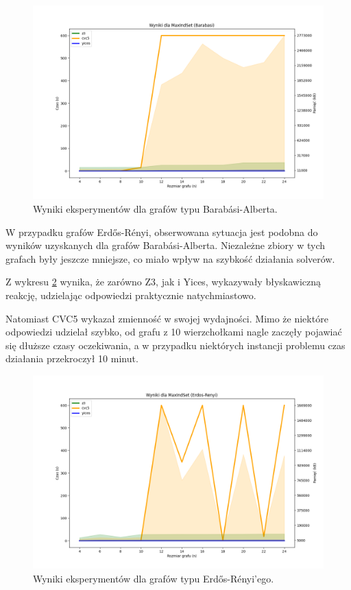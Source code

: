 \begin{figure}[htbp]
	\centering
	\begin{minipage}{\textwidth}
		\includegraphics[width=\textwidth]{./figures/4-barabasi-plot.png}
		\caption{Wyniki eksperymentów dla grafów typu Barabási-Alberta.}
		\label{fig:4-barabasi-plot}
	\end{minipage}
\end{figure}

W przypadku grafów Erdős-Rényi, obserwowana sytuacja jest podobna do wyników uzyskanych dla grafów Barabási-Alberta. Niezależne zbiory w tych grafach były jeszcze mniejsze, co miało wpływ na szybkość działania solverów.

Z wykresu \ref{fig:4-erdos-renyi-plot} wynika, że zarówno Z3, jak i Yices, wykazywały błyskawiczną reakcję, udzielając odpowiedzi praktycznie natychmiastowo.

Natomiast CVC5 wykazał zmienność w swojej wydajności. Mimo że niektóre odpowiedzi udzielał szybko, od grafu z 10 wierzchołkami nagle zaczęły pojawiać się dłuższe czasy oczekiwania, a w przypadku niektórych instancji problemu czas działania przekroczył 10 minut.

\begin{figure}[htbp]
	\centering
	\begin{minipage}{\textwidth}
		\includegraphics[width=\textwidth]{./figures/4-erdos-renyi-plot.png}
		\caption{Wyniki eksperymentów dla grafów typu Erdős-Rényi'ego.}
		\label{fig:4-erdos-renyi-plot}
	\end{minipage}
\end{figure}

